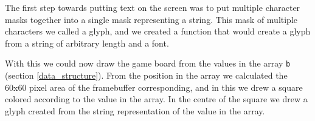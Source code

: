 The first step towards putting text on the screen was to put multiple character masks together into a single mask representing a string.
This mask of multiple characters we called a glyph, and we created a function that would create a glyph from a string of arbitrary length and a font.



With this we could now draw the game board from the values in the array \texttt{b} (section \ref{data_structure}).
From the position in the array we calculated the 60x60 pixel area of the framebuffer corresponding, and in this we drew a square colored according to the value in the array.
In the centre of the square we drew a glyph created from the string representation of the value in the array.


